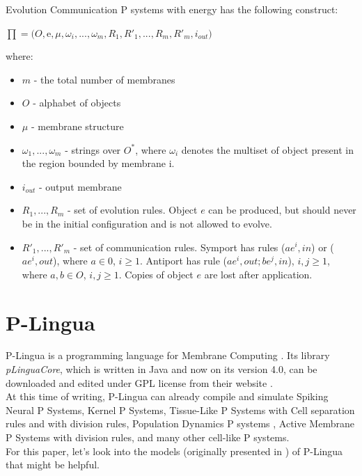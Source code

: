 \documentclass{acm_proc_article-sp}
\begin{document}
    Evolution Communication P systems with energy has the following construct: \cite{ecpe_no-antiport}
    	\begin{center}
        $\prod = (O, $e$, \mu,\omega_i,...,\omega_m,R_1,R'_1,...,R_m,R'_m,i_{out})$\\
        	\end{center}
        where:
        	\begin{itemize}
            	\item $m$ - the total number of membranes 
				\item $O$ - alphabet of objects
                \item $\mu$ - membrane structure
      			\item $\omega_1,...,\omega_m$ - strings over $O^*$, where $\omega_i$ denotes          the multiset of object present in the region bounded by membrane i.
        		\item $i_{out}$ - output membrane
				\item $R_1,...,R_m$ - set of evolution rules. Object $e$ can be produced, but should never be in the initial configuration and is not allowed to evolve.
				\item $R'_1,...,R'_m$ - set of communication rules. Symport has rules ($ae^i,in$) or ($ae^i,out$), where $a \in 0$, $i\geq 1$. Antiport has rule ($ae^i,out;be^j,in$), $i,j\geq 1$, where $a,b \in O$, $i,j \geq 1$. Copies of object $e$ are lost after application.   
			\end{itemize}

\section{P-Lingua} 
	  \indent P-Lingua is a programming language for Membrane Computing \cite{psystem-website}. Its library \textit{pLinguaCore}, which is written in Java and now on its version 4.0, can be downloaded and edited under GPL license from their website\cite{psystem-website}  .  \\
       \indent At this time of writing, P-Lingua can already compile and simulate Spiking Neural P Systems, Kernel P Systems, Tissue-Like P Systems with Cell separation rules and with division rules, Population Dynamics P systems , Active Membrane P Systems with division rules, and many other cell-like P systems.\\
       \indent For this paper, let's look into the models (originally presented in  \cite {p-system}) of P-Lingua that might be helpful.
  
\end{document}
